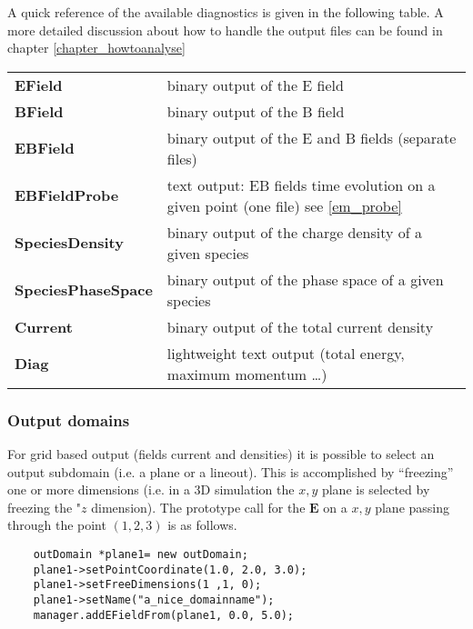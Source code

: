 \documentclass[11pt,a4paper]{report}
\begin{document}
A quick reference of the available diagnostics is given in the following table.
A more detailed discussion about how to handle the output files can be found in chapter \ref{chapter_howtoanalyse}
\begin{center}
    \begin{tabular}{ l | l }
    	\textbf{EField}            & binary output of the E field                                                          \\
    	\textbf{BField}            & binary output of the B field                                                          \\
    	\textbf{EBField}           & binary output of the E and B fields (separate files)                                  \\
    	\textbf{EBFieldProbe}      & text output: EB fields time evolution on a given point (one file) see \ref{em_probe}  \\
    	\textbf{SpeciesDensity}    & binary output of the charge density of a given species                                \\
    	\textbf{SpeciesPhaseSpace} & binary output of the phase space of a given species                                   \\
    	\textbf{Current}           & binary output of the total current density                                            \\
    	\textbf{Diag}              & lightweight text output (total energy, maximum momentum \ldots)
    \end{tabular}
\end{center}

\subsubsection{Output domains}
For grid based output (fields current and densities) it is possible to select an output subdomain (i.e. a plane or a lineout). This is accomplished by ``freezing'' one or more dimensions (i.e. in a 3D simulation the $x,y$ plane is selected by freezing the "$z$ dimension).
The prototype call for the $\mathbf{E}$ on a  $x,y$ plane passing through the point $(1,2,3)$ is as follows.

\begin{lstlisting}
	outDomain *plane1= new outDomain;
	plane1->setPointCoordinate(1.0, 2.0, 3.0);
	plane1->setFreeDimensions(1 ,1, 0);
	plane1->setName("a_nice_domainname");
	manager.addEFieldFrom(plane1, 0.0, 5.0);
\end{lstlisting}
\end{document}
